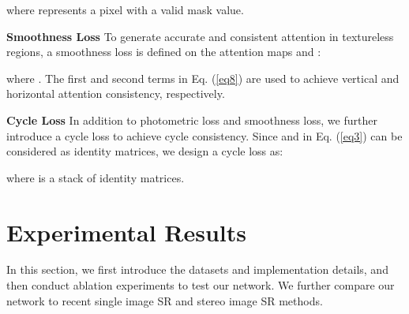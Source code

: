 \documentclass[10pt,twocolumn,letterpaper]{article}
\begin{document}
where  represents a pixel with a valid mask value.

\noindent
\textbf{Smoothness Loss}
To generate accurate and consistent attention in textureless regions, a smoothness loss is defined on the attention maps  and :

where . The first and second terms in Eq. (\ref{eq8}) are used to achieve vertical and horizontal attention consistency, respectively. 

\noindent
\textbf{Cycle Loss}
In addition to photometric loss and smoothness loss, we further introduce a cycle loss to achieve cycle consistency. Since  and  in Eq. (\ref{eq3}) can be considered as identity matrices, we design a cycle loss as:

where   is a stack of \textcolor{black}{} identity matrices.

\begin{table*}[ht]
	\caption{Comparative results achieved on the KITTI 2015 dataset by PASSRnet with different settings for  SR.}
	\label{tab2}
	\begin{center}
		\footnotesize
	\end{center}
\end{table*}

\section{Experimental Results}
In this section, we first introduce the datasets and implementation details, and then conduct ablation experiments to test our network. We further compare our network to recent single image SR and stereo image SR methods.
\end{document}
